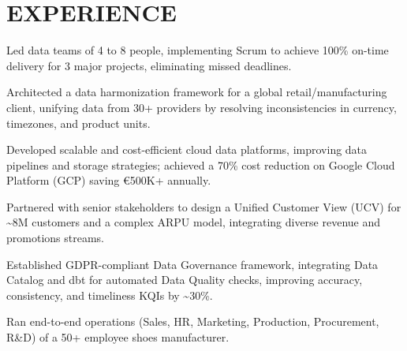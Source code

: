 \documentclass[]{deedy-resume-cv}
\begin{document}
\begin{minipage}[t]{0.60\textwidth}


\section{EXPERIENCE}

\vspace{\topsep} %
\begin{tightemize}
\item Led data teams of 4 to 8 people, implementing Scrum to achieve 100\% on-time delivery for 3 major projects, eliminating missed deadlines.

\item Architected a data harmonization framework for a global retail/manufacturing client, unifying data from 30+ providers by resolving inconsistencies in currency, timezones, and product units.

\item Developed scalable and cost-efficient cloud data platforms, improving data pipelines and storage strategies; achieved a 70\% cost reduction on Google Cloud Platform (GCP) saving €500K+ annually.

\item Partnered with senior stakeholders to design a Unified Customer View (UCV) for \~{}8M customers and a complex ARPU model, integrating diverse revenue and promotions streams.

\item Established GDPR-compliant Data Governance framework, integrating Data Catalog and dbt for automated Data Quality checks, improving accuracy, consistency, and timeliness KQIs by \~{}30\%.
\end{tightemize}

\sectionsep
{}
\begin{tightemize}
\item Ran end-to-end operations (Sales, HR, Marketing, Production, Procurement, R\&D) of a 50+ employee shoes manufacturer.


\end{tightemize}
\end{minipage}
\end{document}
